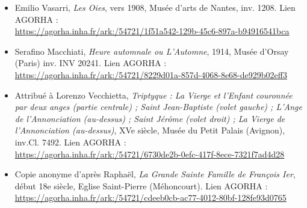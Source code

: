 \begin{itemize}
    \item Emilio Vasarri, \textit{Les Oies}, vers 1908, Musée d'arts de Nantes, inv. 1208. Lien AGORHA : \\ \url{https://agorha.inha.fr/ark:/54721/1f51a542-129b-45c6-897a-b94916541bca}
    \item Serafino Macchiati, \textit{Heure automnale ou L'Automne}, 1914, Musée d'Orsay (Paris) inv. INV 20241. Lien AGORHA : \\ \url{https://agorha.inha.fr/ark:/54721/8229d01a-857d-4068-8e68-de929b02eff3}
    \item Attribué à Lorenzo Vecchietta, \textit{Triptyque : La Vierge et l'Enfant couronnée par deux anges (partie centrale) ; Saint Jean-Baptiste (volet gauche) ; L'Ange de l'Annonciation (au-dessus) ; Saint Jérôme (volet droit) ; La Vierge de l'Annonciation (au-dessus)}, XVe siècle, Musée du Petit Palais (Avignon), inv.Cl. 7492. Lien AGORHA : \\ \url{https://agorha.inha.fr/ark:/54721/6730de2b-0efc-417f-8ece-7321f7ad4d28}
    \item Copie anonyme d'après Raphaël, \textit{La Grande Sainte Famille de François Ier}, début 18e siècle, Eglise Saint-Pierre (Méhoncourt). Lien AGORHA : \\ \url{https://agorha.inha.fr/ark:/54721/cdeeb0cb-ac77-4012-80bf-128fe93d0765}
\end{itemize}